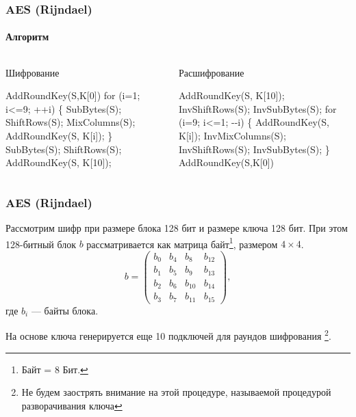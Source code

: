 \begin{frame}[fragile]
    \frametitle{AES (Rijndael)}
    \framesubtitle{Алгоритм}
    
    \begin{columns}
            \begin{block}{Шифрование}
\begin{semiverbatim}
AddRoundKey(S,K[0])
for (i=1; i<=9; ++i) \{
    SubBytes(S);
    ShiftRows(S);
    MixColumns(S);
    AddRoundKey(S, K[i]);
\}
SubBytes(S);
ShiftRows(S);
AddRoundKey(S, K[10]);                
\end{semiverbatim}            
            \end{block}
        
            \begin{block}{Расшифрование}
\begin{semiverbatim}
AddRoundKey(S, K[10]);                
InvShiftRows(S);
InvSubBytes(S);
for (i=9; i<=1; -{-}i) \{
    AddRoundKey(S, K[i]);
    InvMixColumns(S);
    InvShiftRows(S);
    InvSubBytes(S);
\}
AddRoundKey(S,K[0])
\end{semiverbatim}            
            \end{block}
    \end{columns}
\end{frame}


\begin{frame}
    \frametitle{AES (Rijndael)}
    
    Рассмотрим шифр при размере блока 128 бит и размере ключа 128 бит. При этом 128-битный блок $b$ рассматривается как матрица байт\footnote{Байт = 8 Бит.}, размером $4\times 4$.
    \[
        b=
        \begin{pmatrix}
            b_0 & b_4 & b_8     & b_{12} \\
            b_1 & b_5 & b_9     & b_{13} \\
            b_2 & b_6 & b_{10}  & b_{14} \\
            b_3 & b_7 & b_{11}  & b_{15}
        \end{pmatrix},
    \]
    где $b_i$ --- байты блока. 
    
    На основе ключа генерируется еще 10 подключей для раундов шифрования \footnote{Не будем заострять внимание на этой процедуре, называемой процедурой \alert{разворачивания ключа}}.
\end{frame}


